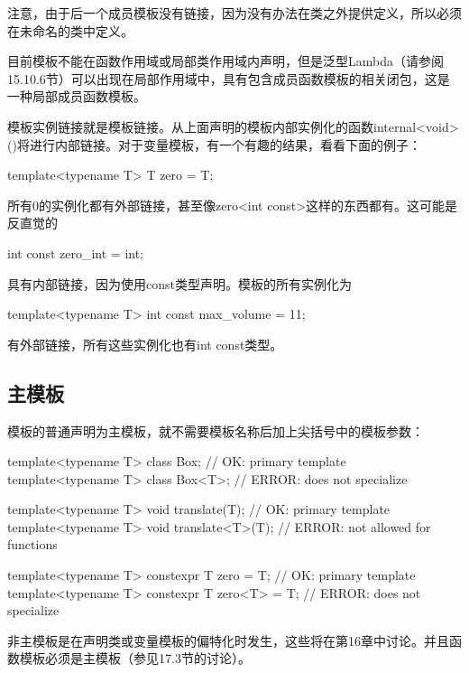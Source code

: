 注意，由于后一个成员模板没有链接，因为没有办法在类之外提供定义，所以必须在未命名的类中定义。

目前模板不能在函数作用域或局部类作用域内声明，但是泛型Lambda（请参阅15.10.6节）可以出现在局部作用域中，具有包含成员函数模板的相关闭包，这是一种局部成员函数模板。

模板实例链接就是模板链接。从上面声明的模板内部实例化的函数internal<void>()将进行内部链接。对于变量模板，有一个有趣的结果，看看下面的例子：

\begin{cpp}
template<typename T> T zero = T{};
\end{cpp}

所有0的实例化都有外部链接，甚至像zero<int const>这样的东西都有。这可能是反直觉的

\begin{cpp}
int const zero_int = int{};
\end{cpp}

具有内部链接，因为使用const类型声明。模板的所有实例化为

\begin{cpp}
template<typename T> int const max_volume = 11;
\end{cpp}

有外部链接，所有这些实例化也有int const类型。

\subsection{主模板}

模板的普通声明为主模板，就不需要模板名称后加上尖括号中的模板参数：

\begin{cpp}
template<typename T> class Box; // OK: primary template
template<typename T> class Box<T>; // ERROR: does not specialize

template<typename T> void translate(T); // OK: primary template
template<typename T> void translate<T>(T); // ERROR: not allowed for functions

template<typename T> constexpr T zero = T{}; // OK: primary template
template<typename T> constexpr T zero<T> = T{}; // ERROR: does not specialize
\end{cpp}

非主模板是在声明类或变量模板的偏特化时发生，这些将在第16章中讨论。并且函数模板必须是主模板（参见17.3节的讨论）。


















